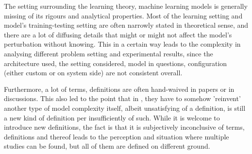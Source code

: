 The setting surrounding the learning theory, machine learning models is generally missing of its rigours and analytical properties. Most of the learning setting and model's training-testing setting are often narrowly stated in theoretical sense, and there are a lot of diffusing details that might or might not affect the model's perturbation without knowing. This in a certain way leads to the complexity in analysing different problem setting and experimental results, since the architecture used, the setting considered, model in questions, configuration (either custom or on system side) are not consistent overall. 

Furthermore, a lot of terms, definitions are often hand-waived in papers or in discussions. This also led to the point that in \cite{nakkiran_deep_2019}, they have to somehow 'reinvent' another type of model complexity itself, albeit unsatisfying of a definition, is still a new kind of definition per insufficiently of such. While it is welcome to introduce new definitions, the fact is that it is subjectively inconclusive of terms, definitions and thereof leads to the perception and situation where multiple studies can be found, but all of them are defined on different ground.

